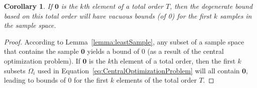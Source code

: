 \documentclass{article}
\newtheorem{corollary}[theorem]{Corollary}
\theoremstyle{definition}
\theoremstyle{remark}
\begin{document}
\begin{corollary}%
\label{cor:vacuous}
    If $\mathbf{0}$ is the $k$th element of a total order $T$, then the degenerate bound based on this total order will have vacuous bounds (of 0) for the first $k$  samples in the sample space.
\end{corollary}
\begin{proof}
    According to Lemma~\ref{lemma:leastSample}, any subset of a sample space that contains the sample $\mathbf{0}$ yields a bound of $0$ (as a result of the central optimization problem). If $\mathbf{0}$ is the $k$th element of a total order, then the first $k$ subsets $\Omega_i$ used in Equation~\ref{eq:CentralOptimizationProblem} will all contain $\mathbf{0}$, leading to bounds of 0 for the first $k$ elements of the total order $T$. 
\end{proof}
\end{document}

